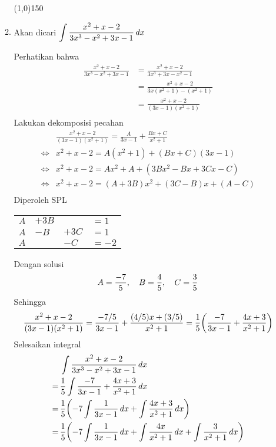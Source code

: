 \begin{enumerate}[leftmargin=*, label={\arabic*}.]
\begin{enumerate}[label={\alph*}.]
\begin{center}\line(1,0){150}\end{center}


    \item Akan dicari $\displaystyle \int \frac{x^{2}+x-2}{3x^{3}-x^{2}+3x-1}\,dx$
    
    Perhatikan bahwa 
    \begin{align*}
        \frac{x^{2}+x-2}{3x^{3}-x^{2}+3x-1} 
        &= \frac{x^{2}+x-2}{3x^{3}+3x-x^{2}-1}\\
        &= \frac{x^{2}+x-2}{3x(x^{2}+1)-(x^{2}+1)}\\
        &= \frac{x^{2}+x-2}{(3x-1)(x^{2}+1)}\\
    \end{align*}
    Lakukan dekomposisi pecahan
    \begin{align*}
        &\frac{x^{2}+x-2}{(3x-1)(x^{2}+1)} 
        = \frac{A}{3x-1}+\frac{Bx+C}{x^{2}+1}\\
        \iff & x^{2}+x-2 = A(x^{2}+1)+(Bx+C)(3x-1)\\
        \iff & x^{2}+x-2 = Ax^{2}+A+(3Bx^{2}-Bx+3Cx-C)\\
        \iff & x^{2}+x-2 = (A+3B)x^{2}+(3C-B)x+(A-C)\\
    \end{align*}
    Diperoleh SPL
    \begin{center}
    \begin{tabular}{llll}
        $A$ &$+3B$ & &$=1$\\
        $A$ &$-B$ &$+3C$ &$=1$\\
        $A$ & &$-C$ &$=-2$
    \end{tabular}
    \end{center}
    Dengan solusi 
    \[
    \displaystyle A=\frac{-7}{5},\quad B=\frac{4}{5},\quad C=\frac{3}{5}
    \]
    Sehingga
    \[
        \frac{x^{2}+x-2}{(3x-1)(x^{2}+1)} 
        = \frac{-7/5}{3x-1}+\frac{(4/5)x+(3/5)}{x^{2}+1}
        = \frac{1}{5}\brk*{\frac{-7}{3x-1}+\frac{4x+3}{x^{2}+1}}
    \]
    Selesaikan integral
    \begin{align*}
        &\int \frac{x^{2}+x-2}{3x^{3}-x^{2}+3x-1}\,dx\\
        =\,&\frac{1}{5}\int\frac{-7}{3x-1}+\frac{4x+3}{x^{2}+1}\,dx\\
        =\,&\frac{1}{5}\brk*{-7\int\frac{1}{3x-1}\,dx
        +\int\frac{4x+3}{x^{2}+1}\,dx}\\
        =\,&\frac{1}{5}\brk*{-7\int\frac{1}{3x-1}\,dx
        +\int\frac{4x}{x^{2}+1}\,dx+\int\frac{3}{x^{2}+1}\,dx}\\

\end{align*}
\end{enumerate}
\end{enumerate}
